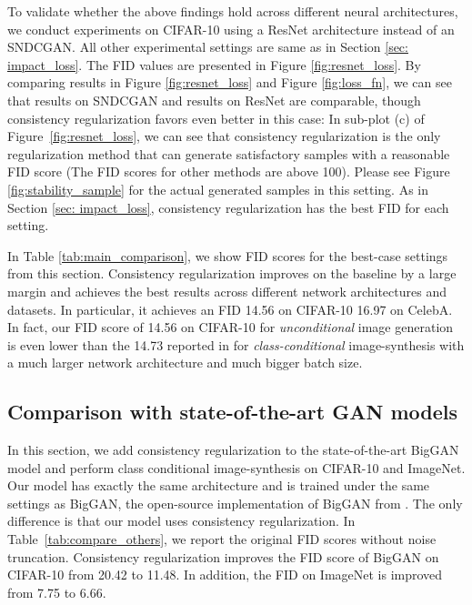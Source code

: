 \documentclass{article} \usepackage{iclr2020_conference,times}
\begin{document}
To validate whether the above findings hold across different neural architectures, 
we conduct experiments on CIFAR-10 using a ResNet \citep{HeZRS15, WGANGP} architecture instead of an 
SNDCGAN.
All other experimental settings are same as in Section \ref{sec: impact_loss}.
The FID values are presented in Figure \ref{fig:resnet_loss}.
By comparing results in Figure \ref{fig:resnet_loss} and Figure \ref{fig:loss_fn}, 
we can see that results on SNDCGAN and results on ResNet are comparable, though 
consistency regularization favors even better in this case:
In sub-plot (c) of Figure~\ref{fig:resnet_loss}, we can see that consistency regularization is the only regularization method that can generate satisfactory samples with a reasonable FID score (The FID scores for other methods are above 100). 
Please see Figure \ref{fig:stability_sample} for the actual generated samples in this setting. 
As in Section \ref{sec: impact_loss}, consistency regularization has the best FID for each setting.

In Table \ref{tab:main_comparison}, we show FID scores for the best-case settings from this section.
Consistency regularization improves on the baseline by a large margin and achieves the best results across different network architectures and datasets.
In particular, it achieves an FID 14.56 on CIFAR-10 16.97 on CelebA. 
In fact, our FID score of 14.56 on CIFAR-10 for \textit{unconditional} image generation is even lower than the 14.73 reported in \citet{BIGGAN} for
\textit{class-conditional} image-synthesis with a much larger network architecture and much bigger batch size.




\subsection{Comparison with state-of-the-art GAN models}

In this section, we add consistency regularization to the state-of-the-art BigGAN
model \citep{BIGGAN} and perform class conditional image-synthesis on CIFAR-10 and ImageNet.
Our model has exactly the same architecture and is trained under the same settings as BigGAN, the open-source implementation of BigGAN from \citet{compare_gan}.
The only difference is that our model uses consistency regularization. 
In Table~\ref{tab:compare_others}, we report the original FID scores without noise truncation.
Consistency regularization improves the FID score of BigGAN on CIFAR-10 from 20.42 to 11.48.
In addition, the FID on ImageNet is improved from 7.75 to 6.66. 
\end{document}
